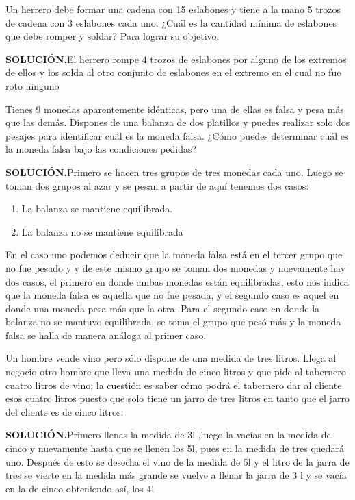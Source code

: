 \begin{ejem}\label{ejem:c3P2}
   Un herrero debe formar una cadena con 15 eslabones y tiene a la mano 5 trozos de cadena con 3 eslabones cada uno. ¿Cuál es la cantidad mínima de eslabones que debe romper y soldar? Para lograr su objetivo.
\end{ejem}
   \textbf{SOLUCIÓN.}El herrero rompe 4 trozos de eslabones por alguno de los extremos de ellos y los solda al otro conjunto de eslabones en el extremo en el cual no fue roto ninguno

\begin{ejem}\label{ejem:c3P3}
   Tienes 9 monedas aparentemente idénticas, pero una de ellas es falsa y pesa más que las demás. Dispones de una balanza de dos platillos y puedes realizar solo dos pesajes para identificar cuál es la moneda falsa. ¿Cómo puedes determinar cuál es la moneda falsa bajo las condiciones pedidas?
\end{ejem}
   \textbf{SOLUCIÓN.}Primero se hacen tres grupos de tres monedas cada uno. Luego se toman dos grupos al azar y se pesan a partir de aquí tenemos dos casos:
   \begin{enumerate}
      \item La balanza se mantiene equilibrada.
      \item La balanza no se mantiene equilibrada
   \end{enumerate}
   En el caso uno podemos deducir que la moneda falsa está en el tercer grupo que no fue pesado y y de este mismo grupo se toman dos monedas y nuevamente hay dos casos, el primero en donde ambas monedas están equilibradas, esto nos indica que la moneda falsa es aquella que no fue pesada, y el segundo caso es aquel en donde una moneda pesa más que la otra.
   Para el segundo caso en donde la balanza no se mantuvo equilibrada, se toma el grupo que pesó más y la moneda falsa se halla de manera análoga al primer caso.

\begin{ejem}\label{ejem:c3P4}
   Un hombre vende vino pero sólo dispone de una medida de tres litros. Llega al negocio otro hombre que lleva una medida de cinco litros y que pide al tabernero cuatro litros de vino; la cuestión es saber cómo podrá el tabernero dar al cliente esos cuatro litros puesto que solo tiene un jarro de tres litros en tanto que el jarro del cliente es de cinco litros.
\end{ejem}
   \textbf{SOLUCIÓN.}Primero llenas la medida de 3l ,luego la vacías en la medida de cinco y nuevamente hasta que se llenen los 5l,  pues en la medida de tres quedará uno. Después de esto se desecha el vino de la medida de 5l y el litro de la jarra de tres se vierte en la medida más grande se vuelve a llenar la jarra de 3 l y se vacía en la de cinco obteniendo así, los 4l

